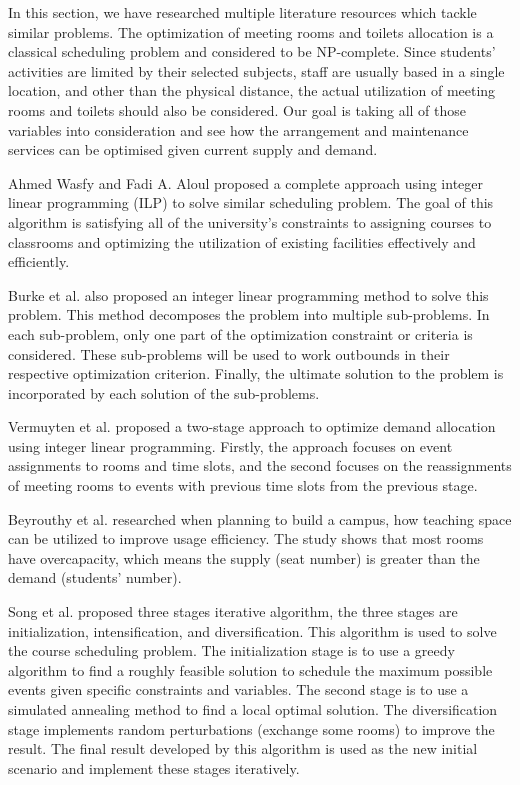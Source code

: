 In this section, we have researched multiple literature resources which tackle similar problems. The optimization of meeting rooms and toilets allocation is a classical scheduling problem and considered to be NP-complete\cite{np_problem}. Since students’ activities are limited by their selected subjects, staff are usually based in a single location, and other than the physical distance, the actual utilization of meeting rooms and toilets should also be considered. Our goal is taking all of those variables into consideration and see how the arrangement and maintenance services can be optimised given current supply and demand.

Ahmed Wasfy and Fadi A. Aloul proposed a complete approach using integer linear programming (ILP) to solve similar scheduling problem\cite{ilp}. The goal of this algorithm is satisfying all of the university's constraints to assigning courses to classrooms and optimizing the utilization of existing facilities effectively and efficiently.  

Burke et al.\cite{burke2010decomposition} also proposed an integer linear programming method to solve this problem. This method decomposes the problem into multiple sub-problems. In each sub-problem, only one part of the optimization constraint or criteria is considered. These sub-problems will be used to work outbounds in their respective optimization criterion. Finally, the ultimate solution to the problem is incorporated by each solution of the sub-problems.

Vermuyten et al.\cite{vermuyten2016developing} proposed a two-stage approach to optimize demand allocation using integer linear programming. Firstly, the approach focuses on event assignments to rooms and time slots, and the second focuses on the reassignments of meeting rooms to events with previous time slots from the previous stage. 

Beyrouthy et al.\cite{doi:10.1057/palgrave.jors.2602523} researched when planning to build a campus, how teaching space can be utilized to improve usage efficiency. The study shows that most rooms have overcapacity, which means the supply (seat number) is greater than the demand (students’ number). 

Song et al.\cite{song2018iterated} proposed three stages iterative algorithm, the three stages are initialization, intensification, and diversification. This algorithm is used to solve the course scheduling problem. The initialization stage is to use a greedy algorithm to find a roughly feasible solution to schedule the maximum possible events given specific constraints and variables. The second stage is to use a simulated annealing method to find a local optimal solution. The diversification stage implements random perturbations (exchange some rooms) to improve the result. The final result developed by this algorithm is used as the new initial scenario and implement these stages iteratively.

